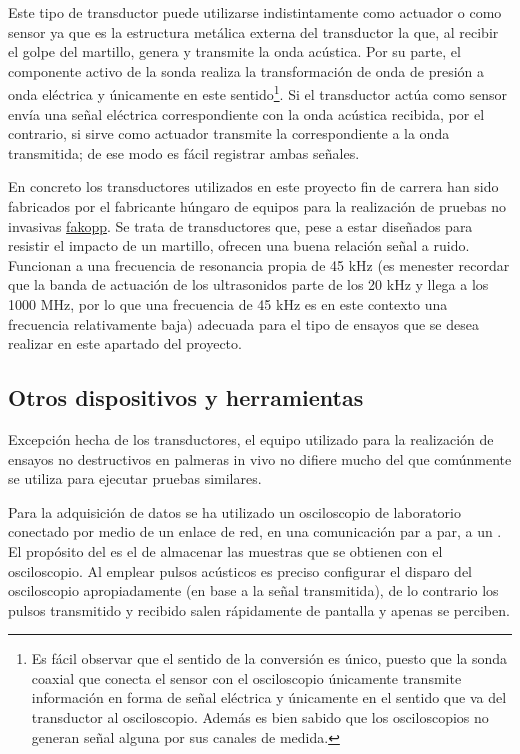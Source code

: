 Este tipo de transductor puede utilizarse indistintamente como actuador o
como sensor ya que es la estructura metálica externa del transductor la
que, al recibir el golpe del martillo, genera y transmite la onda acústica.
Por su parte, el componente activo de la sonda realiza la transformación de
onda de presión a onda eléctrica y únicamente en este sentido\footnote{Es
fácil observar que el sentido de la conversión es único, puesto que la
sonda coaxial que conecta el sensor con el osciloscopio únicamente
transmite información en forma de señal eléctrica y únicamente en el
sentido que va del transductor al osciloscopio. Además es bien sabido que
los osciloscopios no generan señal alguna por sus canales de medida.}. Si
el transductor actúa como sensor envía una señal eléctrica correspondiente
con la onda acústica recibida, por el contrario, si sirve como actuador
transmite la correspondiente a la onda transmitida; de ese modo es fácil
registrar ambas señales.

En concreto los transductores utilizados en este proyecto fin de carrera
han sido fabricados por el fabricante húngaro de equipos para la
realización de pruebas no invasivas
\href{http://www.fakopp.com/site/piezo}{fakopp}. Se trata de transductores que,
pese a estar diseñados para resistir el impacto de un martillo, ofrecen una
buena relación señal a ruido. Funcionan a una frecuencia de resonancia
propia de 45 kHz (es menester recordar que la banda de actuación de los
ultrasonidos parte de los 20 kHz y llega a los 1000 MHz, por lo que una
frecuencia de 45 kHz es en este contexto una frecuencia relativamente
baja) adecuada para el tipo de ensayos que se desea realizar en este
apartado del proyecto.


\subsection{Otros dispositivos y herramientas}

Excepción hecha de los transductores, el equipo utilizado para la realización de
ensayos no destructivos en palmeras in vivo no difiere mucho del que
comúnmente se utiliza para ejecutar pruebas similares.

Para la adquisición de datos se ha utilizado un osciloscopio de laboratorio
conectado por medio de un enlace de red, en una comunicación par a par, a
un . El propósito del  es el de almacenar las muestras que
se obtienen con el osciloscopio. Al emplear pulsos acústicos es preciso
configurar el disparo del osciloscopio apropiadamente (en base a la señal
transmitida), de lo contrario los pulsos transmitido y recibido salen
rápidamente de pantalla y apenas se perciben.

